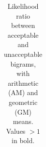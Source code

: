 \begin{table}[t]
\begin{center}
\begin{tabular}{p{0.2cm}p{0.2cm}|p{0.6cm}p{0.6cm}||p{0.2cm}p{0.2cm}|p{0.99cm}p{0.8cm}}


      \hline
    \end{tabular}
  \end{center}
	\caption{\label{tab:phonotactics-results} Likelihood ratio between acceptable and unacceptable bigrams, with arithmetic (AM) and geometric (GM) means. Values $>1$ in bold.}
\end{table}
